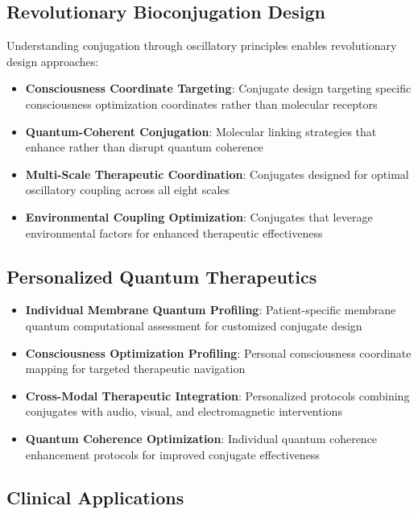 \documentclass[12pt,a4paper]{article}
\begin{document}
\subsection{Revolutionary Bioconjugation Design}

Understanding conjugation through oscillatory principles enables revolutionary design approaches:

\begin{itemize}
\item \textbf{Consciousness Coordinate Targeting}: Conjugate design targeting specific consciousness optimization coordinates rather than molecular receptors
\item \textbf{Quantum-Coherent Conjugation}: Molecular linking strategies that enhance rather than disrupt quantum coherence
\item \textbf{Multi-Scale Therapeutic Coordination}: Conjugates designed for optimal oscillatory coupling across all eight scales
\item \textbf{Environmental Coupling Optimization}: Conjugates that leverage environmental factors for enhanced therapeutic effectiveness
\end{itemize}

\subsection{Personalized Quantum Therapeutics}

\begin{itemize}
\item \textbf{Individual Membrane Quantum Profiling}: Patient-specific membrane quantum computational assessment for customized conjugate design
\item \textbf{Consciousness Optimization Profiling}: Personal consciousness coordinate mapping for targeted therapeutic navigation
\item \textbf{Cross-Modal Therapeutic Integration}: Personalized protocols combining conjugates with audio, visual, and electromagnetic interventions
\item \textbf{Quantum Coherence Optimization}: Individual quantum coherence enhancement protocols for improved conjugate effectiveness
\end{itemize}

\subsection{Clinical Applications}
\end{document}
